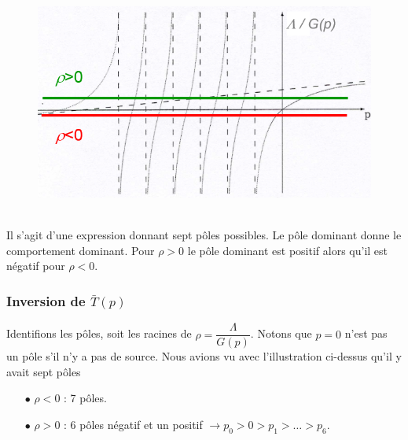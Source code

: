 	\begin{figure}
	\vspace{-5mm}
	\includegraphics[scale=0.23]{ch5/image1.png}
	\end{figure}
\ \\

Il s'agit d'une expression donnant sept pôles possibles. Le pôle dominant donne le comportement 
dominant. Pour $\rho >0$ le pôle dominant est positif alors qu'il est négatif pour $\rho<0$.\vspace{3mm}


\subsubsection{Inversion de $\bar T(p)$}
Identifions les pôles, soit les racines de $\rho =\dfrac{\Lambda}{G(p)}$. Notons que $p=0$ n'est 
pas un pôle s'il n'y a pas de source. Nous avions vu avec l'illustration ci-dessus qu'il y avait
sept pôles
\begin{itemize}
\item[$\bullet$] $\rho<0$ : 7 pôles.
\item[$\bullet$] $\rho>0$ : 6 pôles négatif et un positif $\to p_0>0>p_1>\dots > p_6$.
\end{itemize}\ 

